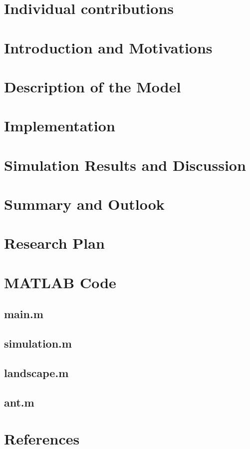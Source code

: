 \documentclass[11pt]{article}
\begin{document}
\newpage


\tableofcontents

\newpage






\section{Individual contributions}

\newpage
\section{Introduction and Motivations}

\section{Description of the Model}

\section{Implementation}

\section{Simulation Results and Discussion}

\section{Summary and Outlook}

\appendix

\section{Research Plan}

\section{MATLAB Code}
\subsection{main.m}

\subsection{simulation.m}

\subsection{landscape.m}

\subsection{ant.m}


\section{References}



\end{document}
